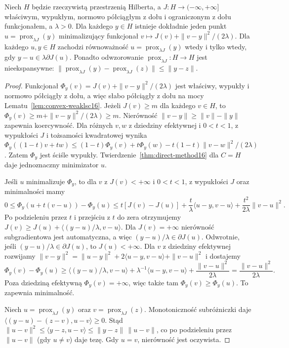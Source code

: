 \begin{twierdzenie}
\label{thm:prox16}
Niech $H$ będzie rzeczywistą przestrzenią Hilberta,
a $J:H\to(-\infty,+\infty]$ właściwym, wypukłym,
normowo półciągłym z dołu i ograniczonym z dołu funkcjonałem,
a $\lambda>0$. Dla każdego $y\in H$ istnieje dokładnie
jeden punkt $u=\operatorname{prox}_{\lambda J}(y)$
minimalizujący funkcjonał
$v\mapsto J(v)+\|v-y\|^2/(2\lambda)$.
Dla każdego $u,y\in H$ zachodzi równoważność
$u=\operatorname{prox}_{\lambda J}(y)$ wtedy i tylko wtedy,
gdy $y-u\in\lambda\partial J(u)$.
Ponadto odwzorowanie
$\operatorname{prox}_{\lambda J}:H\to H$ jest
nieekspansywne:
$\|\operatorname{prox}_{\lambda J}(y)-
\operatorname{prox}_{\lambda J}(z)\|\le\|y-z\|$.
\end{twierdzenie}
\begin{proof}
Funkcjonał $\Phi_y(v)=J(v)+\|v-y\|^2/(2\lambda)$
jest właściwy, wypukły i normowo półciągły z dołu,
a więc słabo półciągły z dołu na mocy
Lematu~\ref{lem:convex-weaklsc16}.
Jeżeli $J(v)\ge m$ dla każdego $v\in H$, to
$\Phi_y(v)\ge m+\|v-y\|^2/(2\lambda)\ge m$.
Nierówność $\|v-y\|\ge\|v\|-\|y\|$ zapewnia koercywność.
Dla różnych $v,w$ z dziedziny efektywnej i $0<t<1$,
z wypukłości $J$ i tożsamości kwadratowej wynika
$\Phi_y((1-t)v+tw)\le(1-t)\Phi_y(v)+t\Phi_y(w)
-t(1-t)\|v-w\|^2/(2\lambda)$.
Zatem $\Phi_y$ jest ściśle wypukły.
Twierdzenie~\ref{thm:direct-method16} dla $C=H$
daje jednoznaczny minimizator $u$.

Jeśli $u$ minimalizuje $\Phi_y$, to dla $v$ z
$J(v)<+\infty$ i $0<t<1$, z wypukłości $J$
oraz minimalności mamy
\[
0\le\Phi_y(u+t(v-u))-\Phi_y(u)
\le t[J(v)-J(u)]+\frac t\lambda\langle u-y,v-u\rangle
+\frac{t^2}{2\lambda}\|v-u\|^2.
\]
Po podzieleniu przez $t$ i przejściu z $t$ do zera
otrzymujemy $J(v)\ge J(u)+\langle(y-u)/\lambda,v-u\rangle$.
Dla $J(v)=+\infty$ nierówność subgradientowa jest
automatyczna, a więc $(y-u)/\lambda\in\partial J(u)$.
Odwrotnie, jeśli $(y-u)/\lambda\in\partial J(u)$,
to $J(u)<+\infty$. Dla $v$ z dziedziny efektywnej
rozwijamy $\|v-y\|^2=\|u-y\|^2+
2\langle u-y,v-u\rangle+\|v-u\|^2$ i dostajemy
\[
\Phi_y(v)-\Phi_y(u)
\ge\langle (y-u)/\lambda,v-u\rangle+
\lambda^{-1}\langle u-y,v-u\rangle+
\frac{\|v-u\|^2}{2\lambda}
=\frac{\|v-u\|^2}{2\lambda}.
\]
Poza dziedziną efektywną $\Phi_y(v)=+\infty$, więc
także tam $\Phi_y(v)\ge\Phi_y(u)$. To zapewnia minimalność.

Niech $u=\operatorname{prox}_{\lambda J}(y)$ oraz
$v=\operatorname{prox}_{\lambda J}(z)$.
Monotoniczność subróżniczki daje
$\langle (y-u)-(z-v),u-v\rangle\ge0$.
Stąd $\|u-v\|^2\le\langle y-z,u-v\rangle
\le\|y-z\|\,\|u-v\|$,
co po podzieleniu przez $\|u-v\|$ (gdy $u\ne v$)
daje tezę. Gdy $u=v$, nierówność jest oczywista.
\end{proof}

